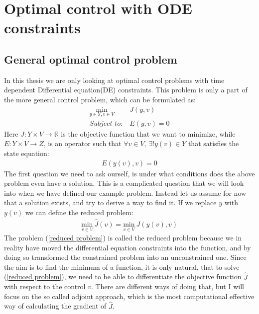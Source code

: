 \chapter{Optimal control with ODE constraints}
\section{General optimal control problem}
In this thesis we are only looking at optimal control problems with time dependent Differential equation(DE) constraints. This problem is only a part of the more general control problem, which can be formulated as:
\begin{align}
\underset{y\in Y,v\in V}{\text{min}} \ &J(y,v) \\
\textit{Subject to:} \ &E(y,v)=0
\end{align}
Here $J: Y\times V\rightarrow\mathbb{R}$ is the objective function that we want to minimize, while $E:Y\times V \rightarrow Z$, is an operator such that $\forall v \in V$, $\exists! y(v)\in Y$ that satisfies the state equation:
\begin{align*}
E(y(v),v)=0
\end{align*}
The first question we need to ask ourself, is under what conditions does the above problem even have a solution. This is a complicated question that we will look into when we have defined our example problem. Instead let us assume for now that a solution exists, and try to derive a way to find it. If we replace $y$ with $y(v)$ we can define the reduced problem:
\begin{align}
\underset{v\in V}{\text{min}} \ \hat J(v)=\underset{v\in V}{\text{min}} \ J(y(v),v)  \label{reduced problem}
\end{align}
The problem (\ref{reduced problem}) is called the reduced problem because we in reality have moved the differential equation constraints into the function, and by doing so transformed the constrained problem into an unconstrained one. Since the aim is to find the minimum of a function, it is only natural, that to solve (\ref{reduced problem}), we need to be able to differentiate the objective function $\hat{J}$ with respect to the control $v$. There are different ways of doing that, but I will focus on the so called adjoint approach, which is the most computational effective way of calculating the gradient of $\hat{J}$.
